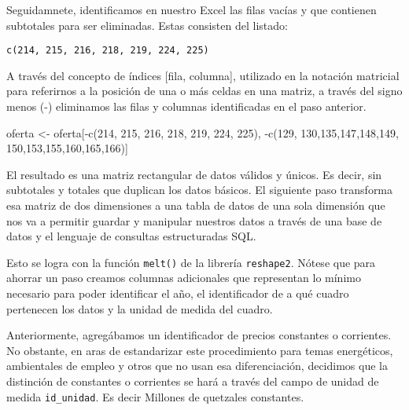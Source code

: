 \documentclass[
]{article}
\newenvironment{Shaded}{\begin{snugshade}}{\end{snugshade}}
\newcommand{\DecValTok}[1]{\textcolor[rgb]{0.00,0.00,0.81}{#1}}
\newcommand{\FunctionTok}[1]{\textcolor[rgb]{0.00,0.00,0.00}{#1}}
\newcommand{\NormalTok}[1]{#1}
\newcommand{\OtherTok}[1]{\textcolor[rgb]{0.56,0.35,0.01}{#1}}
\newcommand{\SpecialCharTok}[1]{\textcolor[rgb]{0.00,0.00,0.00}{#1}}
\begin{document}
Seguidamnete, identificamos en nuestro Excel las filas vacías y que
contienen subtotales para ser eliminadas. Estas consisten del listado:

\begin{verbatim}
c(214, 215, 216, 218, 219, 224, 225)
\end{verbatim}

A través del concepto de índices {[}fila, columna{]}, utilizado en la
notación matricial para referirnos a la posición de una o más celdas en
una matriz, a través del signo menos (-) eliminamos las filas y columnas
identificadas en el paso anterior.

\begin{Shaded}
\begin{Highlighting}[]
\NormalTok{oferta }\OtherTok{\textless{}{-}}\NormalTok{ oferta[}\SpecialCharTok{{-}}\FunctionTok{c}\NormalTok{(}\DecValTok{214}\NormalTok{, }\DecValTok{215}\NormalTok{, }\DecValTok{216}\NormalTok{, }\DecValTok{218}\NormalTok{, }\DecValTok{219}\NormalTok{,}
                    \DecValTok{224}\NormalTok{, }\DecValTok{225}\NormalTok{),}
                 \SpecialCharTok{{-}}\FunctionTok{c}\NormalTok{(}\DecValTok{129}\NormalTok{, }\DecValTok{130}\NormalTok{,}\DecValTok{135}\NormalTok{,}\DecValTok{147}\NormalTok{,}\DecValTok{148}\NormalTok{,}\DecValTok{149}\NormalTok{,}
                    \DecValTok{150}\NormalTok{,}\DecValTok{153}\NormalTok{,}\DecValTok{155}\NormalTok{,}\DecValTok{160}\NormalTok{,}\DecValTok{165}\NormalTok{,}\DecValTok{166}\NormalTok{)]}
\end{Highlighting}
\end{Shaded}

El resultado es una matriz rectangular de datos válidos y únicos. Es
decir, sin subtotales y totales que duplican los datos básicos. El
siguiente paso transforma esa matriz de dos dimensiones a una tabla de
datos de una sola dimensión que nos va a permitir guardar y manipular
nuestros datos a través de una base de datos y el lenguaje de consultas
estructuradas SQL.

Esto se logra con la función \texttt{melt()} de la librería
\texttt{reshape2}. Nótese que para ahorrar un paso creamos columnas
adicionales que representan lo mínimo necesario para poder identificar
el año, el identificador de a qué cuadro pertenecen los datos y la
unidad de medida del cuadro.

Anteriormente, agregábamos un identificador de precios constantes o
corrientes. No obstante, en aras de estandarizar este procedimiento para
temas energéticos, ambientales de empleo y otros que no usan esa
diferenciación, decidimos que la distinción de constantes o corrientes
se hará a través del campo de unidad de medida \texttt{id\_unidad}. Es
decir Millones de quetzales constantes.
\end{document}
